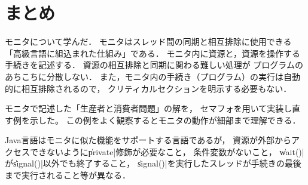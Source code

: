 \section{まとめ}
モニタについて学んだ．
モニタはスレッド間の同期と相互排除に使用できる
「高級言語に組込まれた仕組み」である．
モニタ内に資源と，資源を操作する手続きを記述する．
資源の相互排除と同期に関わる難しい処理が
プログラムのあちこちに分散しない．
また，モニタ内の手続き（プログラム）の実行は自動的に相互排除されるので，
クリティカルセクションを明示する必要もない．

モニタで記述した「生産者と消費者問題」の解を，
セマフォを用いて実装し直す例を示した。
この例をよく観察するとモニタの動作が細部まで理解できる．

Java言語はモニタに似た機能をサポートする言語であるが，
資源が外部からアクセスできないように\|private|修飾が必要なこと，
条件変数がないこと，
\|wait()|が\|signal()|以外でも終了すること，
\|signal()|を実行したスレッドが手続きの最後まで実行されること等が異なる．

\newpage
